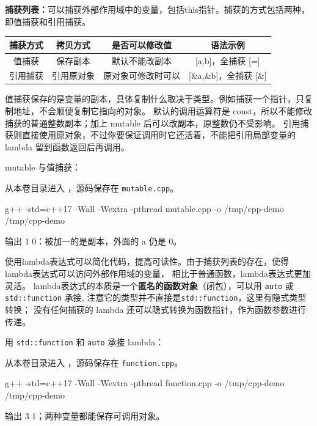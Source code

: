 \textbf{捕获列表：}可以捕获外部作用域中的变量，包括this指针。捕获的方式包括两种，即值捕获和引用捕获。

\begin{center}
    \begin{tabular}{cccc}
        \toprule[1.5pt]
        捕获方式 & 拷贝方式 & 是否可以修改值 & 语法示例 \\
        \midrule[1pt]
        值捕获 & 保存副本 & 默认不能改副本 & [a,b]，全捕获 [=] \\
        引用捕获 & 引用原对象 & 原对象可修改时可以 & [\&a,\&b]，全捕获 [\&] \\
        \bottomrule[1.5pt]
    \end{tabular}
\end{center}

值捕获保存的是变量的副本，具体复制什么取决于类型。例如捕获一个指针，只复制地址，不会顺便复制它指向的对象。
默认的调用运算符是 const，所以不能修改捕获的普通整数副本；加上 mutable 后可以改副本，原整数仍不受影响。
引用捕获则直接使用原对象，不过你要保证调用时它还活着，不能把引用局部变量的 lambda 留到函数返回后再调用。

\begin{example}
mutable 与值捕获：



从本卷目录进入 ，源码保存在 \texttt{mutable.cpp}。
\begin{tbash}
g++ -std=c++17 -Wall -Wextra -pthread mutable.cpp -o /tmp/cpp-demo
/tmp/cpp-demo
\end{tbash}
输出 1 0：被加一的是副本，外面的 a 仍是 0。
\end{example}

使用lambda表达式可以简化代码，提高可读性。由于捕获列表的存在，使得lambda表达式可以访问外部作用域的变量，
相比于普通函数，lambda表达式更加灵活。
lambda表达式的本质是一个\textbf{匿名的函数对象}（闭包），可以用 \texttt{auto} 或 \texttt{std::function} 承接, 注意它的类型并不直接是\texttt{std::function}，这里有隐式类型转换；
没有任何捕获的 lambda 还可以隐式转换为函数指针，作为函数参数进行传递。

\begin{example}
用 \texttt{std::function} 和 \texttt{auto} 承接 lambda：



从本卷目录进入 ，源码保存在 \texttt{function.cpp}。
\begin{tbash}
g++ -std=c++17 -Wall -Wextra -pthread function.cpp -o /tmp/cpp-demo
/tmp/cpp-demo
\end{tbash}
输出 3 1；两种变量都能保存可调用对象。
\end{example}

